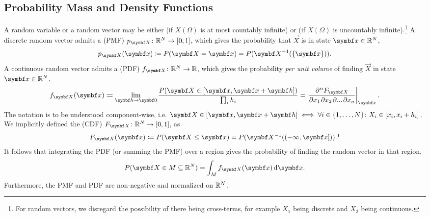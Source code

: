 \subsection{Probability Mass and Density Functions}
A random variable or a random vector may be either  (if \( X(Ω) \) is at most countably infinite) or  (if \( X(Ω) \) is uncountably infinite).\footnote{
    For random vectors, we disregard the possibility of there being cross-terms, for example \( X_1 \) being discrete and \( X_2 \) being continuous.
}
A discrete random vector admits a  (PMF) \( p_{\vec{X}}\colon \reals^N \to [0, 1] \), which gives the probability that \( \vec{X} \) is in state \( \vec{x} \in \reals^N\),
\begin{equation}
    \label{eq:introduction:definiton_pmf}
    p_{\vec{X}}(\vec{x}) \coloneq P(\vec{X} = \vec{x}) = P(\vec{X}^{-1}(\set{\vec{x}})).
\end{equation}
A continuous random vector admits a  (PDF) \( f_{\vec{X}}\colon \reals^N \to \reals \), which gives the probability \emph{per unit volume} of finding \( \vec{X} \) in state \( \vec{x} \in \reals^N \),
\begin{equation}
    \label{eq:introduction:definition_pdf}
    f_{\vec{X}}(\vec{x}) \coloneq \lim_{\vec{h} \to \vec{0}} \frac{P(\vec{X} \in [\vec{x}, \vec{x} + \vec{h}])}{\prod_{i} h_i} = \eval{\diffp<n>{F_{\vec{X}}}{x_1,x_2,...,x_n}}{\vec{x}}.
\end{equation}
The notation is to be understood component-wise, i.e. \( \vec{X} \in [\vec{x}, \vec{x} + \vec{h}] \iff \forall i \in \set{1,\dots, N}\colon X_i \in [x_i, x_i + h_i] \).
We implicitly defined the  (CDF) \( F_{\vec{X}}\colon \reals^N \to [0, 1] \), as 
\begin{equation}
    \label{eq:introduction:definition_cdf}
    F_{\vec{X}}(\vec{x}) \coloneq P(\vec{X} \leq \vec{x}) = P(\vec{X}^{-1}((-\infty, \vec{x}])).\footnotemark
\end{equation}
%
It follows that integrating the PDF (or summing the PMF) over a region gives the probability of finding the random vector in that region,
\begin{equation}
    P(\vec{X} \in M \subseteq \reals^N) = \int_M f_{\vec{X}}(\vec{x}) \difl{\vec{x}}.
\end{equation}
Furthermore, the PMF and PDF are non-negative and normalized on \( \mathbb{R}^N \).

